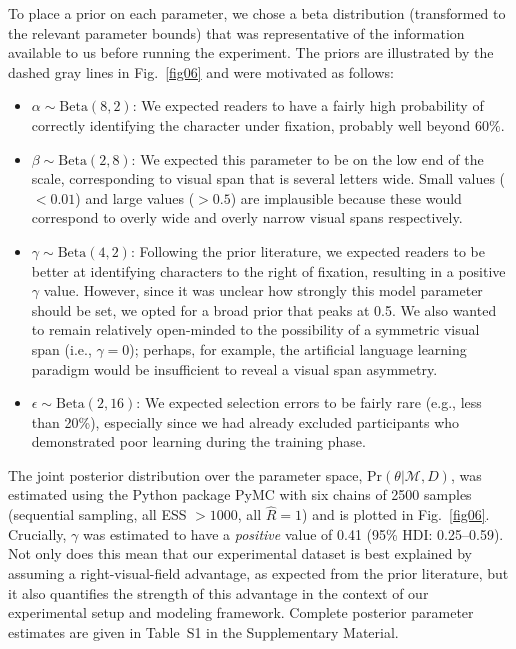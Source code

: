 \documentclass[doc,biblatex]{apa7}
\begin{document}
To place a prior on each parameter, we chose a beta distribution (transformed to the relevant parameter bounds) that was representative of the information available to us before running the experiment. The priors are illustrated by the dashed gray lines in Fig.~\ref{fig06} and were motivated as follows:
\begin{itemize}
    \item $\alpha \sim \mathrm{Beta}(8, 2)$: We expected readers to have a fairly high probability of correctly identifying the character under fixation, probably well beyond 60\%.
    \item $\beta \sim \mathrm{Beta}(2, 8)$: We expected this parameter to be on the low end of the scale, corresponding to visual span that is several letters wide. Small values ($< 0.01$) and large values ($> 0.5$) are implausible because these would correspond to overly wide and overly narrow visual spans respectively.
    \item $\gamma \sim \mathrm{Beta}(4, 2)$: Following the prior literature, we expected readers to be better at identifying characters to the right of fixation, resulting in a positive $\gamma$ value. However, since it was unclear how strongly this model parameter should be set, we opted for a broad prior that peaks at 0.5. We also wanted to remain relatively open-minded to the possibility of a symmetric visual span (i.e., $\gamma = 0$); perhaps, for example, the artificial language learning paradigm would be insufficient to reveal a visual span asymmetry.
    \item $\epsilon \sim \mathrm{Beta}(2, 16)$: We expected selection errors to be fairly rare (e.g., less than 20\%), especially since we had already excluded participants who demonstrated poor learning during the training phase.
\end{itemize}

The joint posterior distribution over the parameter space, $\mathrm{Pr}(\theta|\mathcal{M},D)$, was estimated using the Python package PyMC with six chains of 2500 samples (sequential sampling, all ESS $> 1000$, all $\hat{R}=1$) and is plotted in Fig.~\ref{fig06}. Crucially, $\gamma$ was estimated to have a \textit{positive} value of 0.41 (95\% HDI: 0.25--0.59). Not only does this mean that our experimental dataset is best explained by assuming a right-visual-field advantage, as expected from the prior literature, but it also quantifies the strength of this advantage in the context of our experimental setup and modeling framework. Complete posterior parameter estimates are given in Table~S1 in the Supplementary Material.
\end{document}
